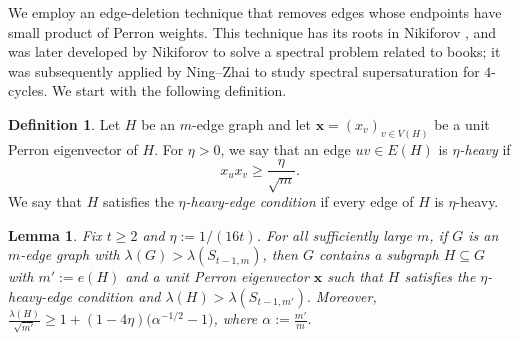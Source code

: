 \documentclass[11pt]{article}
\newtheorem{lemma}[theorem]{Lemma}
\theoremstyle{definition}
\newtheorem{definition}[theorem]{Definition}
\theoremstyle{plain}
\begin{document}
We employ an edge-deletion technique that removes edges whose endpoints have small product of Perron weights. 
This technique has its roots in Nikiforov  \cite{Nikiforov2007C4FreeMaxSpectralRadius}, 
and was later developed by Nikiforov \cite{Niki2021} to solve a spectral problem related to books; it was subsequently applied by Ning--Zhai \cite{NZ2021b} to study spectral supersaturation for \(4\)-cycles. 
We start with the following definition.

\begin{definition} \label{def:heavy-edge}
Let $H$ be an $m$-edge graph and let $\bm{x}=(x_v)_{v\in V(H)}$ be a unit Perron eigenvector of $H$.
For $\eta>0$, we say that an edge $uv\in E(H)$ is \emph{$\eta$-heavy} if
\[
        x_u x_v \ge \frac{\eta}{\sqrt m}.
\]
We say that $H$ satisfies the \emph{$\eta$-heavy-edge condition} if every edge of $H$ is $\eta$-heavy. 
\end{definition}

\begin{lemma} \label{lem:lemmaA-pruning}
Fix $t\ge 2$ and $\eta:=1/(16t)$.
For all sufficiently large $m$, if $G$ is an $m$-edge graph with $\lambda(G) > \lambda(S_{t-1,m})$, then $G$ contains a subgraph $H\subseteq G$ with
$m':=e(H)$ and a unit Perron eigenvector $\bm{x}$ such that $H$ satisfies the $\eta$-heavy-edge condition and $\lambda(H)>\lambda(S_{t-1,m'}).$
Moreover, $\frac{\lambda(H)}{\sqrt{m'}}
        \ge
        1+(1-4\eta)\bigl(\alpha^{-1/2}-1\bigr)$, where $\alpha:=\frac{m'}{m}.$
\end{lemma}
\end{document}
